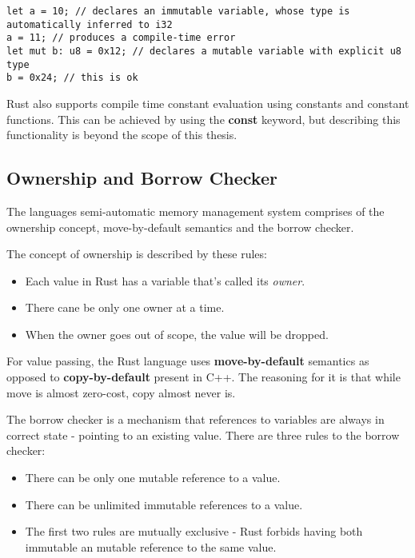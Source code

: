 \begin{lstlisting}[caption={An example of declaring variables and their mutability in Rust.},label=lst:mut]
let a = 10; // declares an immutable variable, whose type is automatically inferred to i32
a = 11; // produces a compile-time error
let mut b: u8 = 0x12; // declares a mutable variable with explicit u8 type
b = 0x24; // this is ok
\end{lstlisting}

Rust also supports compile time constant evaluation using constants and constant functions.
This can be achieved by using the \textbf{const} keyword, but describing this functionality is beyond the scope of this thesis.

\subsection{Ownership and Borrow Checker}
\label{subsec:borrow}
The languages semi-automatic memory management system comprises of the ownership concept, move-by-default semantics and the borrow checker.

The concept of ownership is described by these rules\cite{klabnik_rust_nodate}:
\begin{itemize}
    \item Each value in Rust has a variable that's called its \textit{owner}.
    \item There cane be only one owner at a time.
    \item When the owner goes out of scope, the value will be dropped.
\end{itemize}
For value passing, the Rust language uses \textbf{move-by-default} semantics as opposed to \textbf{copy-by-default} present in C++.
The reasoning for it is that while move is almost zero-cost, copy almost never is.

The borrow checker is a mechanism that references to variables are always in correct state - pointing to an existing value.
There are three rules to the borrow checker:
\begin{itemize}
    \item There can be only one mutable reference to a value.
    \item There can be unlimited immutable references to a value.
    \item The first two rules are mutually exclusive - Rust forbids having both immutable an mutable reference to the same value.
\end{itemize}

